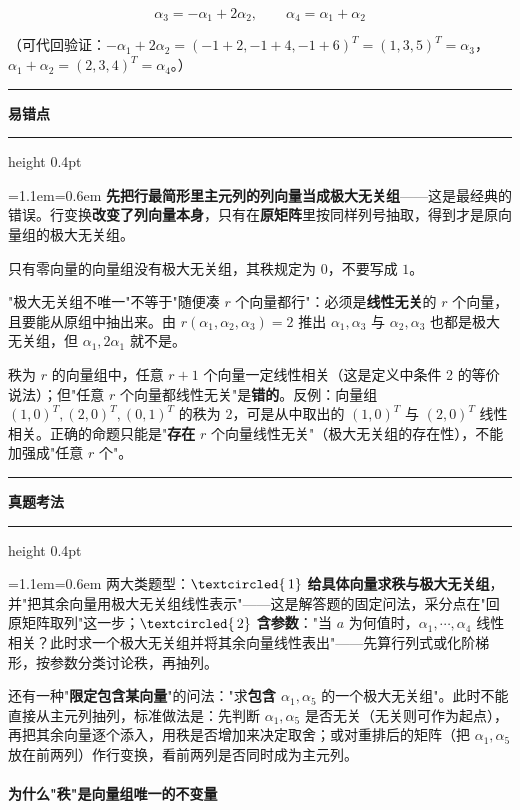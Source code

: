 \documentclass[11pt,openany,UTF8]{ctexbook}
\newcommand{\circled}[1]{\textcircled{\scriptsize\,#1}}
\newcommand{\callouthead}[2]{%
  \par\addvspace{7pt}\noindent
  {\color{#1}\rule[-0.15em]{3pt}{1.05em}}\hspace{0.5em}%
  {\bfseries\color{#1}#2}\par\nobreak\vspace{-0.35em}%
  {\color{rulesep}\hrule height 0.4pt}\nobreak\vspace{0.45em}%
  \begingroup\small\setlength{\parindent}{0pt}%
  \leftskip=1.1em\rightskip=0.6em\noindent\ignorespaces}
\newcommand{\calloutend}{\par\endgroup\addvspace{7pt}}
\newenvironment{callwarn}[1]{\callouthead{warnbar}{#1}}{\calloutend}
\newenvironment{callexam}[1]{\callouthead{exambar}{#1}}{\calloutend}
\begin{document}
\[\alpha_3=-\alpha_1+2\alpha_2,\qquad \alpha_4=\alpha_1+\alpha_2\]

（可代回验证：$-\alpha_1+2\alpha_2=(-1+2,-1+4,-1+6)^T=(1,3,5)^T=\alpha_3$，$\alpha_1+\alpha_2=(2,3,4)^T=\alpha_4$。）

\begin{callwarn}{易错点}
\textbf{先把行最简形里主元列的列向量当成极大无关组}——这是最经典的错误。行变换\textbf{改变了列向量本身}，只有在\textbf{原矩阵}里按同样列号抽取，得到才是原向量组的极大无关组。

只有零向量的向量组没有极大无关组，其秩规定为 $0$，不要写成 $1$。

"极大无关组不唯一"不等于"随便凑 $r$ 个向量都行"：必须是\textbf{线性无关}的 $r$ 个向量，且要能从原组中抽出来。由 $r(\alpha_1,\alpha_2,\alpha_3)=2$ 推出 $\alpha_1,\alpha_3$ 与 $\alpha_2,\alpha_3$ 也都是极大无关组，但 $\alpha_1,2\alpha_1$ 就不是。

秩为 $r$ 的向量组中，任意 $r+1$ 个向量一定线性相关（这是定义中条件 2 的等价说法）；但"任意 $r$ 个向量都线性无关"是\textbf{错的}。反例：向量组 $(1,0)^T,(2,0)^T,(0,1)^T$ 的秩为 $2$，可是从中取出的 $(1,0)^T$ 与 $(2,0)^T$ 线性相关。正确的命题只能是"\textbf{存在} $r$ 个向量线性无关"（极大无关组的存在性），不能加强成"任意 $r$ 个"。

\end{callwarn}

\begin{callexam}{真题考法}
两大类题型：$\circled{1}$ \textbf{给具体向量求秩与极大无关组}，并"把其余向量用极大无关组线性表示"——这是解答题的固定问法，采分点在"回原矩阵取列"这一步；$\circled{2}$ \textbf{含参数}："当 $a$ 为何值时，$\alpha_1,\cdots,\alpha_4$ 线性相关？此时求一个极大无关组并将其余向量线性表出"——先算行列式或化阶梯形，按参数分类讨论秩，再抽列。

还有一种"\textbf{限定包含某向量}"的问法："求\textbf{包含 $\alpha_1,\alpha_5$} 的一个极大无关组"。此时不能直接从主元列抽列，标准做法是：先判断 $\alpha_1,\alpha_5$ 是否无关（无关则可作为起点），再把其余向量逐个添入，用秩是否增加来决定取舍；或对重排后的矩阵（把 $\alpha_1,\alpha_5$ 放在前两列）作行变换，看前两列是否同时成为主元列。

\end{callexam}

\paragraph{为什么"秩"是向量组唯一的不变量}\mbox{}{\par}
\end{document}
